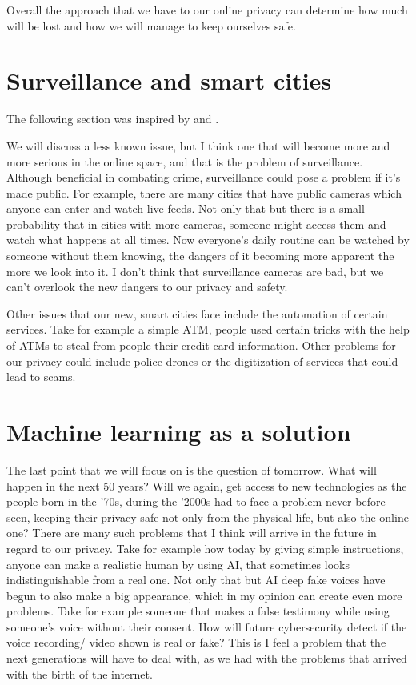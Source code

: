 \documentclass[a4paper,12pt]{report}
\begin{document}
Overall the approach that we have to our online privacy can determine how much will be lost and how we will manage to keep ourselves safe.

\section{Surveillance and smart cities}

The following section was inspired by \cite{Alan} and \cite{Michael}. 

We will discuss a less known issue, but I think one that will become more and more serious in the online space, and that is the problem of surveillance. Although beneficial in combating crime, surveillance could pose a problem if it's made public. For example, there are many cities that have public cameras which anyone can enter and watch live feeds. Not only that but there is a small probability that in cities with more cameras, someone might access them and watch what happens at all times. Now everyone's daily routine can be watched by someone without them knowing, the dangers of it becoming more apparent the more we look into it. I don't think that surveillance cameras are bad, but we can't overlook the new dangers to our privacy and safety.

Other issues that our new, smart cities face include the automation of certain services. Take for example a simple ATM, people used certain tricks with the help of ATMs to steal from people their credit card information. Other problems for our privacy could include police drones or the digitization of services that could lead to scams.

\section{Machine learning as a solution}

The last point that we will focus on is the question of tomorrow. What will happen in the next 50 years? Will we again, get access to new technologies as the people born in the '70s, during the '2000s had to face a problem never before seen, keeping their privacy safe not only from the physical life, but also the online one? There are many such problems that I think will arrive in the future in regard to our privacy. Take for example how today by giving simple instructions, anyone can make a realistic human by using AI, that sometimes looks indistinguishable from a real one. Not only that but AI deep fake voices have begun to also make a big appearance, which in my opinion can create even more problems. Take for example someone that makes a false testimony while using someone's voice without their consent. How will future cybersecurity detect if the voice recording/ video shown is real or fake? This is I feel a problem that the next generations will have to deal with, as we had with the problems that arrived with the birth of the internet.
\end{document}
